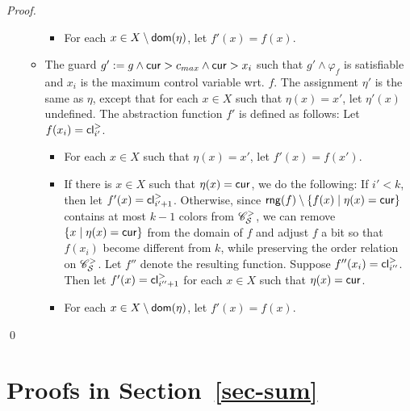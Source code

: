\begin{appendix}
\begin{proof}
\begin{itemize}
\begin{itemize}
\begin{itemize}
\item For each $x \in X \setminus \mathsf{dom}(\eta)$, let $f'(x)=f(x)$.  
\end{itemize}
%
\item The guard $g' := g \wedge \mathsf{cur} > c_{max} \wedge  \mathsf{cur} > x_i$ such that $g' \wedge \varphi_f$ is satisfiable and $x_i$ is the maximum control variable wrt. $f$. The assignment $\eta'$ is the same as $\eta$, except that for each $x \in X$ such that $\eta(x)=x'$, let $\eta'(x)$ undefined.  The abstraction function $f'$ is defined as follows: Let $f(x_i)=\mathsf{cl}^>_{i'}$.
\begin{itemize}
\item For each $x \in X$ such that $\eta(x)=x'$, let $f'(x)=f(x')$.
%
\item If there is $x \in X$ such that $\eta(x)=\mathsf{cur}$, we do the following: If $i' < k$, then let $f'(x)= \mathsf{cl}^{>}_{i'+1}$. Otherwise, since $\mathsf{rng}(f) \setminus \{f(x) \mid \eta(x)=\mathsf{cur}\}$ contains at most $k-1$ colors from $\mathscr{C}^>_{\mathcal{S} }$,  we can remove $\{x \mid \eta(x)=\mathsf{cur}\}$ from the domain of $f$ and adjust $f$ a bit so that $f(x_i)$ become different from $k$, while preserving the order relation on $\mathscr{C}^>_{\mathcal{S} }$. Let $f''$ denote the resulting function. Suppose $f''(x_i)=\mathsf{cl}^>_{i''}$. Then let $f'(x)=\mathsf{cl}^>_{i''+1}$ for each $x \in X$ such that $\eta(x)=\mathsf{cur}$. 

\item For each $x \in X \setminus \mathsf{dom}(\eta)$, let $f'(x)=f(x)$. 
\end{itemize}
\end{itemize}
\end{itemize}
\qed
\end{proof}

\section{Proofs in Section~\ref{sec-sum}}



\end{appendix}
